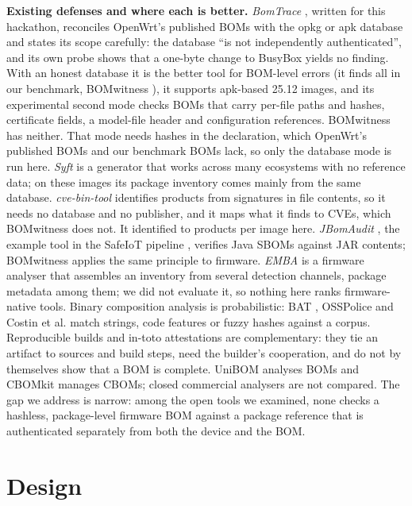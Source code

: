 \documentclass[sigconf,nonacm]{acmart}
\newcommand{\tool}{BOMwitness}
\begin{document}
\textbf{Existing defenses and where each is better.}
\emph{BomTrace} \cite{bomtrace}, written for this hackathon, reconciles OpenWrt's published BOMs with the opkg or apk database and states its scope carefully: the database ``is not independently authenticated'', and its own probe shows that a one-byte change to BusyBox yields no finding. With an honest database it is the better tool for BOM-level errors (it finds all \nBomErrCases{} in our benchmark, \tool{} \tpHonBw{}), it supports apk-based 25.12 images, and its experimental second mode checks BOMs that carry per-file paths and hashes, certificate fields, a model-file header and configuration references. \tool{} has neither. That mode needs hashes in the declaration, which OpenWrt's published BOMs and our benchmark BOMs lack, so only the database mode is run here.
\emph{Syft} \cite{syft} is a generator that works across many ecosystems with no reference data; on these images its package inventory comes mainly from the same database.
\emph{cve-bin-tool} \cite{cvebintool} identifies products from signatures in file contents, so it needs no database and no publisher, and it maps what it finds to CVEs, which \tool{} does not. It identified \invCveMin{} to \invCveMax{} products per image here.
\emph{JBomAudit} \cite{jbomaudit}, the example tool in the SafeIoT pipeline \cite{safeiotpipeline}, verifies Java SBOMs against JAR contents; \tool{} applies the same principle to firmware.
\emph{EMBA} \cite{emba} is a firmware analyser that assembles an inventory from several detection channels, package metadata among them; we did not evaluate it, so nothing here ranks firmware-native tools.
Binary composition analysis is probabilistic: BAT \cite{hemel2011finding}, OSSPolice \cite{duan2017osspolice} and Costin et al. \cite{costin2014large} match strings, code features or fuzzy hashes against a corpus. Reproducible builds and in-toto attestations \cite{lamb2022reproducible,intoto} are complementary: they tie an artifact to sources and build steps, need the builder's cooperation, and do not by themselves show that a BOM is complete. UniBOM \cite{unibom} analyses BOMs and CBOMkit \cite{cbomkit} manages CBOMs; closed commercial analysers are not compared.
The gap we address is narrow: among the open tools we examined, none checks a hashless, package-level firmware BOM against a package reference that is authenticated separately from both the device and the BOM.

\section{Design}
\label{sec:design}
\end{document}
